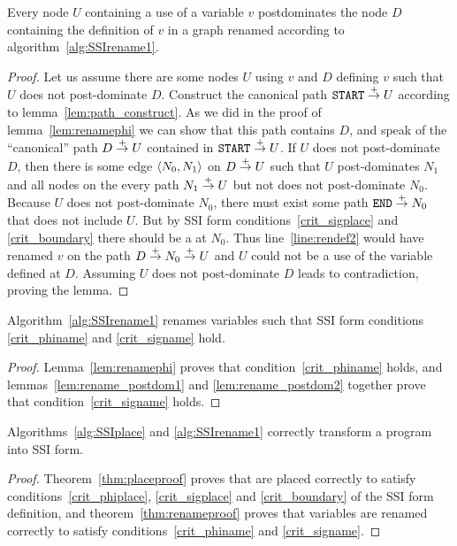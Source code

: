 \documentclass[12pt,titlepage,twoside]{article}
\begin{document}
\begin{lemma}\label{lem:rename_postdom2}
Every node $U$ containing a use of a variable $v$ postdominates the
node $D$ containing the definition of $v$ in a graph renamed according
to algorithm~\ref{alg:SSIrename1}.
\end{lemma}
\begin{proof}
Let us assume there are some nodes $U$ using $v$ and $D$ defining $v$
such that $U$ does not post-dominate $D$.  Construct the canonical
path $\texttt{START}\stackrel{+}{\rightarrow} U$ according to
lemma~\ref{lem:path_construct}.  As we did in the proof of
lemma~\ref{lem:renamephi} we can show that this path contains $D$, and
speak of the ``canonical'' path $D\stackrel{+}{\rightarrow} U$ contained in
$\texttt{START}\stackrel{+}{\rightarrow} U$.  If $U$ does not post-dominate $D$, then
there is some edge $\left\langle N_0,N_1 \right\rangle$ on $D\stackrel{+}{\rightarrow} U$ such that $U$
post-dominates $N_1$ and all nodes on the every path $N_1 \stackrel{+}{\rightarrow} U$
but not does not post-dominate $N_0$.  Because $U$ does not
post-dominate $N_0$, there must exist some path $\texttt{END}\stackrel{+}{\rightarrow}
N_0$ that does not include $U$.  But by SSI form
conditions~\ref{crit_sigplace} and \ref{crit_boundary} there should be
a \sigfunction at $N_0$.  Thus line~\ref{line:rendef2} would have
renamed $v$ on the path $D\stackrel{+}{\rightarrow} N_0 \stackrel{+}{\rightarrow} U$ and $U$ could not
be a use of the variable defined at $D$.  Assuming $U$ does not
post-dominate $D$ leads to contradiction, proving the lemma.
\end{proof}

\begin{theorem}\label{thm:renameproof}
Algorithm~\ref{alg:SSIrename1} renames variables such that SSI form
conditions \ref{crit_phiname} and \ref{crit_signame} hold.
\end{theorem}
\begin{proof}
Lemma~\ref{lem:renamephi} proves that condition~\ref{crit_phiname}
holds, and lemmas~\ref{lem:rename_postdom1} and
\ref{lem:rename_postdom2} together prove that
condition~\ref{crit_signame} holds.
\end{proof}

\begin{theorem}
Algorithms~\ref{alg:SSIplace} and \ref{alg:SSIrename1} correctly
transform a program into SSI form.
\end{theorem}
\begin{proof}
Theorem~\ref{thm:placeproof} proves that  are placed
correctly to satisfy conditions~\ref{crit_phiplace},
\ref{crit_sigplace} and \ref{crit_boundary} of the SSI form
definition, and theorem~\ref{thm:renameproof} proves that variables
are renamed correctly to satisfy conditions~\ref{crit_phiname} and
\ref{crit_signame}.
\end{proof}
\end{document}
